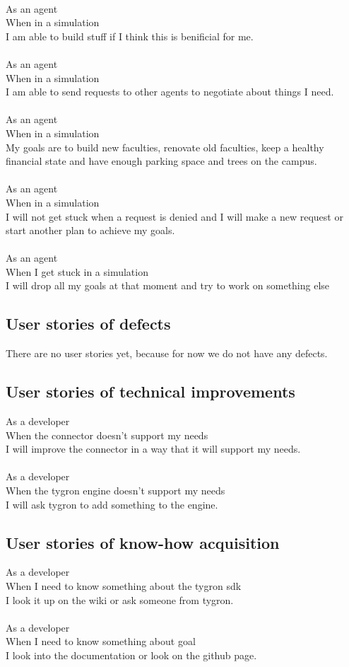\\
As an agent\\
When in a simulation\\
I am able to build stuff if I think this is benificial for me.\\
\\
As an agent\\
When in a simulation\\
I am able to send requests to other agents to negotiate about things I need.\\
\\
As an agent\\
When in a simulation\\
My goals are to build new faculties, renovate old faculties, keep a healthy financial state and have enough parking space and trees on the campus.\\
\\
As an agent\\
When in a simulation\\
I will not get stuck when a request is denied and I will make a new request or start another plan to achieve my goals.\\
\\
As an agent\\
When I get stuck in a simulation\\
I will drop all my goals at that moment and try to work on something else

\subsection{User stories of defects}
There are no user stories yet, because for now we do not have any defects.

\subsection{User stories of technical improvements}
As a developer\\
When the connector doesn't support my needs\\
I will improve the connector in a way that it will support my needs.\\
\\
As a developer\\
When the tygron engine doesn't support my needs\\
I will ask tygron to add something to the engine.

\subsection{User stories of know-how acquisition}
As a developer\\
When I need to know something about the tygron sdk\\
I look it up on the wiki or ask someone from tygron.\\
\\
As a developer\\
When I need to know something about goal\\
I look into the documentation or look on the github page.


